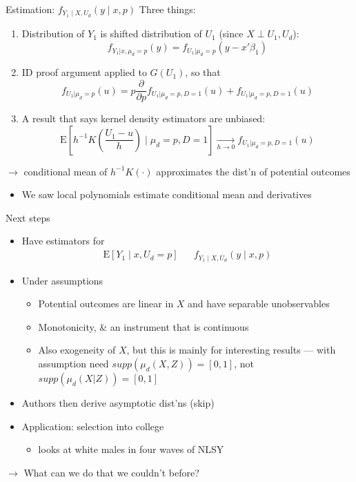 \documentclass{beamer}
\begin{document}
\begin{frame}{Estimation: $f_{Y_1\mid X,U_d}(y\mid x,p)$}
  Three things:
  \begin{enumerate}
\item Distribution of $Y_1$ is shifted distribution of $U_1$ (since  $X \perp U_1,U_d$):
\begin{equation*}
  f_{Y_1|x,\mu_d=p}(y) = f_{U_1|\mu_d=p}(y-x'\beta_1)
\end{equation*} \pause
\item ID proof argument applied to $G(U_1)$, so that
  \begin{equation*}
    f_{U_1|\mu_d=p}(u) = p \frac{\partial}{\partial
    p}f_{U_1|\mu_d=p,D=1}(u) + f_{U_1|\mu_d=p,D=1}(u)
  \end{equation*} \pause
\item A result that says kernel density estimators are unbiased:
  \begin{equation*}
    \mathrm{E}\left[h^{-1}K\left(\frac{U_1-u}{h}\right)\mid \mu_d=p,
      D=1\right]\xrightarrow[h \rightarrow 0]{} f_{U_1|\mu_d=p,D=1}(u)
  \end{equation*} \pause
  \end{enumerate}
  
$\rightarrow$ conditional mean of
  $h^{-1}K(\cdot)$ approximates the dist'n of potential outcomes \pause
\begin{itemize}
  \item We saw local polynomials estimate conditional mean and derivatives
  \end{itemize}

\end{frame}

\begin{frame}{Next steps}
  \begin{itemize}
  \item Have estimators for
    \begin{eqnarray*}
  \mathrm{E}[Y_1\mid x,U_d=p] &   & f_{Y_1\mid X,U_d}(y\mid x,p)
    \end{eqnarray*}
    \item Under assumptions
    \begin{itemize}
    \item Potential outcomes are linear in $X$ and have separable unobservables
    \item Monotonicity, \& an instrument that is continuous
      \item Also exogeneity of $X$, but this is mainly for interesting results --- with assumption need $supp(\mu_d(X,Z))=[0,1]$, not $supp(\mu_d(X|Z))=[0,1]$
    \end{itemize} \pause
  \item Authors then derive asymptotic dist'ns \pause (skip) \pause
  \item Application: selection into college
    \begin{itemize}
      \item looks at white males in four waves of NLSY
    \end{itemize}
  \end{itemize} 
  $\rightarrow$ What can we do that we couldn't before?
\end{frame}
\end{document}
